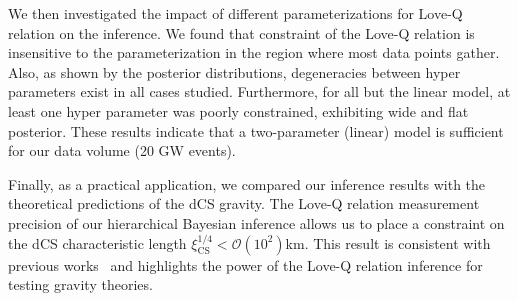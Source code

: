 \documentclass[a4paper,11pt]{article}
\begin{document}
We then investigated the impact of different parameterizations for Love-Q relation on the inference. 
We found that constraint of the Love-Q relation is insensitive to the parameterization in the region where most data points gather.
Also, as shown by the posterior distributions, degeneracies between hyper parameters exist in all cases studied. 
Furthermore, for all but the linear model, at least one hyper parameter was poorly constrained, exhibiting wide and flat posterior. 
These results indicate that a two-parameter (linear) model is sufficient for our data volume (20 GW events).

Finally, as a practical application, we compared our inference results with the theoretical predictions of the dCS gravity. The Love-Q relation measurement precision 
of our hierarchical Bayesian inference allows us to place a constraint on the dCS characteristic length $\xi_{\mathrm{CS}}^{1/4} < \mathcal{O}(10^2)$km. 
This result is consistent with previous works~\cite{Yagi:2013bca, Yagi:2013awa} and highlights the power of the Love-Q relation inference for testing gravity theories.

\acknowledgments

\clearpage


% 

\end{document}
